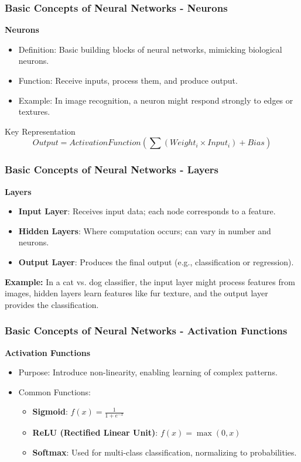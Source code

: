 \documentclass[aspectratio=169]{beamer}
\begin{document}
\begin{frame}[fragile]
    \frametitle{Basic Concepts of Neural Networks - Neurons}
    \textbf{Neurons}
    \begin{itemize}
        \item Definition: Basic building blocks of neural networks, mimicking biological neurons.
        \item Function: Receive inputs, process them, and produce output.
        \item Example: In image recognition, a neuron might respond strongly to edges or textures.
    \end{itemize}
    \begin{block}{Key Representation}
        \begin{equation}
            Output = ActivationFunction \left( \sum (Weight_i \times Input_i) + Bias \right)
        \end{equation}
    \end{block}
\end{frame}

\begin{frame}[fragile]
    \frametitle{Basic Concepts of Neural Networks - Layers}
    \textbf{Layers}
    \begin{itemize}
        \item \textbf{Input Layer}: Receives input data; each node corresponds to a feature.
        \item \textbf{Hidden Layers}: Where computation occurs; can vary in number and neurons.
        \item \textbf{Output Layer}: Produces the final output (e.g., classification or regression).
    \end{itemize}
    \textbf{Example:} In a cat vs. dog classifier, the input layer might process features from images, hidden layers learn features like fur texture, and the output layer provides the classification.
\end{frame}

\begin{frame}[fragile]
    \frametitle{Basic Concepts of Neural Networks - Activation Functions}
    \textbf{Activation Functions}
    \begin{itemize}
        \item Purpose: Introduce non-linearity, enabling learning of complex patterns.
        \item Common Functions:
        \begin{itemize}
            \item \textbf{Sigmoid}: \( f(x) = \frac{1}{1 + e^{-x}} \) 
            \item \textbf{ReLU (Rectified Linear Unit)}: \( f(x) = \max(0, x) \) 
            \item \textbf{Softmax}: Used for multi-class classification, normalizing to probabilities.
        \end{itemize}
    \end{itemize}
\end{frame}
\end{document}

